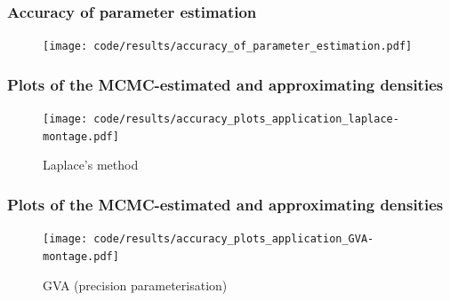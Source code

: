\documentclass{beamer}
\begin{document}
	\begin{frame}
		\frametitle{Accuracy of parameter estimation}
		\begin{figure}
			\texttt{[image: code/results/accuracy\_of\_parameter\_estimation.pdf]}
		\end{figure}
	\end{frame}
		
	\begin{frame}
		\frametitle{Plots of the MCMC-estimated and approximating densities}
		\begin{figure}
			\caption{Laplace's method}
			\texttt{[image: code/results/accuracy\_plots\_application\_laplace-montage.pdf]}
		\end{figure}
	\end{frame}
		
	\begin{frame}
		\frametitle{Plots of the MCMC-estimated and approximating densities}
		\begin{figure}
			\caption{GVA (precision parameterisation)}
			\texttt{[image: code/results/accuracy\_plots\_application\_GVA-montage.pdf]}
		\end{figure}
	\end{frame}
		
		
		
\end{document}
